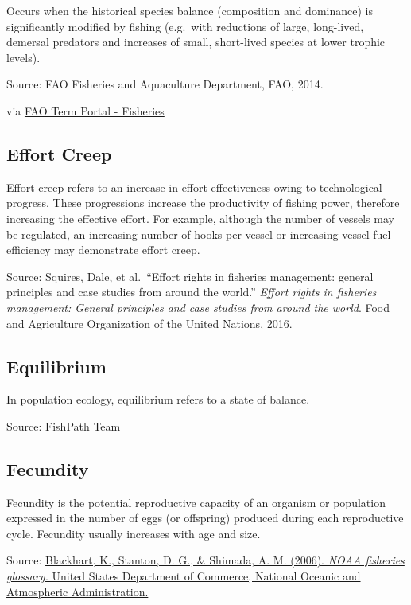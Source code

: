 \documentclass[
  11pt,
]{book}
\begin{document}
Occurs when the historical species balance (composition and dominance) is significantly modified by fishing (e.g.~with reductions of large, long-lived, demersal predators and increases of small, short-lived species at lower trophic levels).

Source: FAO Fisheries and Aquaculture Department, FAO, 2014.

via \href{http://www.fao.org/fishery/glossary/en}{FAO Term Portal - Fisheries}

\hypertarget{effort-creep}{%
\subsection{Effort Creep}\label{effort-creep}}

Effort creep refers to an increase in effort effectiveness owing to technological progress. These progressions increase the productivity of fishing power, therefore increasing the effective effort. For example, although the number of vessels may be regulated, an increasing number of hooks per vessel or increasing vessel fuel efficiency may demonstrate effort creep.

Source: Squires, Dale, et al.~``Effort rights in fisheries management: general principles and case studies from around the world.'' \emph{Effort rights in fisheries management: General principles and case studies from around the world}. Food and Agriculture Organization of the United Nations, 2016.

\hypertarget{equilibrium}{%
\subsection{Equilibrium}\label{equilibrium}}

In population ecology, equilibrium refers to a state of balance.

Source: FishPath Team

\hypertarget{fecundity}{%
\subsection{Fecundity}\label{fecundity}}

Fecundity is the potential reproductive capacity of an organism or population expressed in the number of eggs (or offspring) produced during each reproductive cycle. Fecundity usually increases with age and size.

Source: \href{https://repository.library.noaa.gov/view/noaa/12856}{Blackhart, K., Stanton, D. G., \& Shimada, A. M. (2006). \emph{NOAA fisheries glossary.} United States Department of Commerce, National Oceanic and Atmospheric Administration.}
\end{document}
